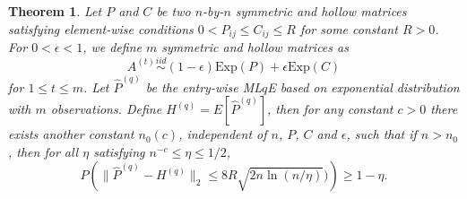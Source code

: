 \documentclass[a4paper]{article}
\newtheorem{theorem}[fact]{Theorem}
\renewcommand{\hat}{\widehat}
\begin{document}
\begin{theorem}
\label{thm:PqDiff}
Let $P$ and $C$ be two $n$-by-$n$ symmetric and hollow matrices satisfying element-wise conditions $0 < P_{ij} \le C_{ij} \le R$ for some constant $R > 0$. For $0 < \epsilon < 1$, we define $m$ symmetric and hollow matrices as
\[
	A^{(t)} \stackrel{iid}{\sim} (1-\epsilon) \mathrm{Exp}(P) + \epsilon \mathrm{Exp}(C)
\]
for $1 \le t \le m$.
Let $\hat{P}^{(q)}$ be the entry-wise ML$q$E based on exponential distribution with $m$ observations.
Define $H^{(q)} = E[\hat{P}^{(q)}]$,
then for any constant $c > 0$ there exists another constant $n_0(c)$, independent of $n$, $P$, $C$ and $\epsilon$, such that if $n > n_0$, then for all $\eta$ satisfying $n^{-c} \le \eta \le 1/2$,
\[
	P \left( \| \hat{P}^{(q)} - H^{(q)} \|_2 \le 8 R \sqrt{2 n \ln(n/\eta)}) \right) \ge 1 - \eta.
\]
\end{theorem}
\end{document}
